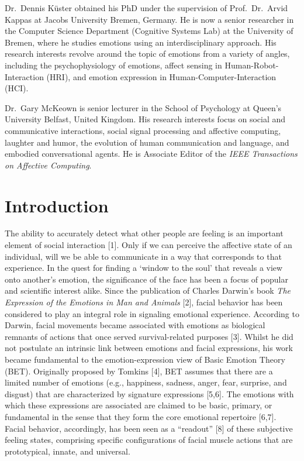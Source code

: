 \documentclass[10pt,letterpaper]{article}
\begin{document}
Dr.~Dennis Küster obtained his PhD under the supervision of Prof.~Dr.~Arvid Kappas at Jacobs University Bremen, Germany. He is now a senior researcher in the Computer Science Department (Cognitive Systems Lab) at the University of Bremen, where he studies emotions using an interdisciplinary approach. His research interests revolve around the topic of emotions from a variety of angles, including the psychophysiology of emotions, affect sensing in Human-Robot-Interaction (HRI), and emotion expression in Human-Computer-Interaction (HCI).

Dr.~Gary McKeown is senior lecturer in the School of Psychology at Queen's University Belfast, United Kingdom. His research interests focus on social and communicative interactions, social signal processing and affective computing, laughter and humor, the evolution of human communication and language, and embodied conversational agents. He is Associate Editor of the \emph{IEEE Transactions on Affective Computing}.

\linenumbers

\nolinenumbers





\hypertarget{introduction}{%
\section*{Introduction}\label{introduction}}

The ability to accurately detect what other people are feeling is an important element of social interaction {[}1{]}. Only if we can perceive the affective state of an individual, will we be able to communicate in a way that corresponds to that experience. In the quest for finding a `window to the soul' that reveals a view onto another's emotion, the significance of the face has been a focus of popular and scientific interest alike. Since the publication of Charles Darwin's book \emph{The Expression of the Emotions in Man and Animals} {[}2{]}, facial behavior has been considered to play an integral role in signaling emotional experience. According to Darwin, facial movements became associated with emotions as biological remnants of actions that once served survival-related purposes {[}3{]}. Whilst he did not postulate an intrinsic link between emotions and facial expressions, his work became fundamental to the emotion-expression view of Basic Emotion Theory (BET). Originally proposed by Tomkins {[}4{]}, BET assumes that there are a limited number of emotions (e.g., happiness, sadness, anger, fear, surprise, and disgust) that are characterized by signature expressions {[}5,6{]}. The emotions with which these expressions are associated are claimed to be basic, primary, or fundamental in the sense that they form the core emotional repertoire {[}6,7{]}. Facial behavior, accordingly, has been seen as a ``readout'' {[}8{]} of these subjective feeling states, comprising specific configurations of facial muscle actions that are prototypical, innate, and universal.
\end{document}
